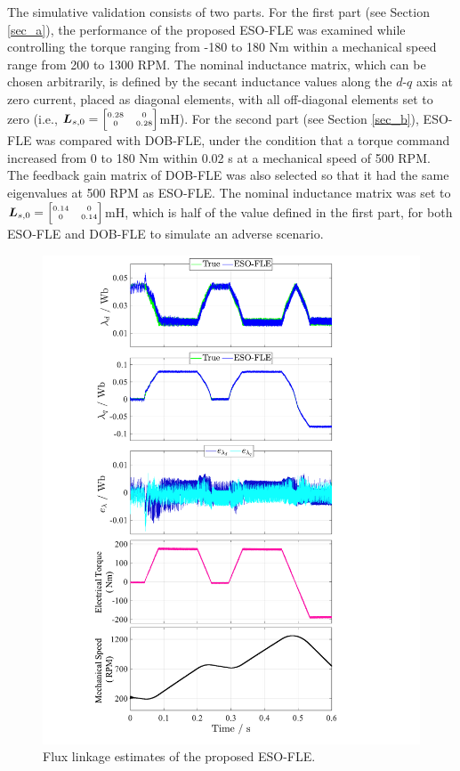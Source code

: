 \documentclass[conference]{IEEEtran}
\begin{document}
The simulative validation consists of two parts. For the first part (see Section \ref{sec_a}), the performance of the proposed ESO-FLE was examined while controlling the torque ranging from -180 to 180 Nm within a mechanical speed range from 200 to 1300 RPM. The nominal inductance matrix, which can be chosen 
arbitrarily, is defined by the secant inductance values along the $d$-$q$ axis at zero current, placed as diagonal elements, with all off-diagonal elements set to zero (i.e., ${\boldsymbol{ {L}}}_{s,0}  = {\tiny \begin{bmatrix} 0.28 & 0 \\ 0 & 0.28 \end{bmatrix}}$mH). 
For the second part (see 
Section \ref{sec_b}), ESO-FLE was compared with DOB-FLE, under the condition that a torque command increased from 0 to 180 Nm within 0.02 s at a mechanical speed of 500 RPM. The feedback gain matrix of DOB-FLE was also selected so that it had the same eigenvalues at 500 RPM as ESO-FLE. The nominal inductance matrix was set to ${\boldsymbol{ {L}}}_{s,0}  = {\tiny \begin{bmatrix} 0.14 & 0 \\ 0 & 0.14 \end{bmatrix}}$mH, which is half of the value defined in the first part, for both ESO-FLE and DOB-FLE to simulate an adverse scenario.
 
\begin{figure}[!t]
    \centering
    \captionsetup{font=footnotesize}
    \includegraphics[width=0.9\columnwidth ]{Fig4.pdf}
    \caption{Flux linkage estimates of the proposed ESO-FLE.}\label{Fig4}
\end{figure}
\end{document}
